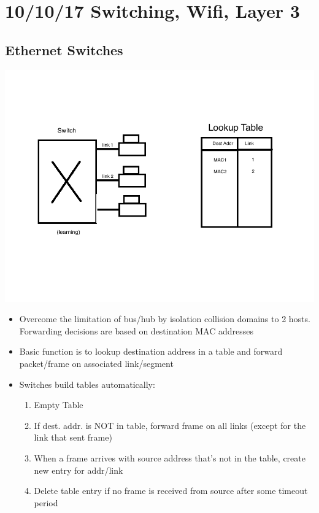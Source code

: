 \documentclass[11pt]{article}
\begin{document}
\section{10/10/17  Switching, Wifi, Layer 3}
\label{sec:orgheadline53}

\subsection{Ethernet Switches}
\label{sec:orgheadline46}
\includegraphics[width=.9\linewidth]{diagrams/switch.png}
\begin{itemize}
\item Overcome the limitation of bus/hub by isolation collision domains to
2 hosts. Forwarding decisions are based on destination MAC addresses
\item Basic function is to lookup destination address in a table and
forward packet/frame on associated link/segment
\item Switches build tables automatically:
\begin{enumerate}
\item Empty Table
\item If dest. addr. is NOT in table, forward frame on all links
(except for the link that sent frame)
\item When a frame arrives with source address that's not in the table,
create new entry for addr/link
\item Delete table entry if no frame is received from source after some
timeout period
\end{enumerate}
\end{itemize}
\end{document}
